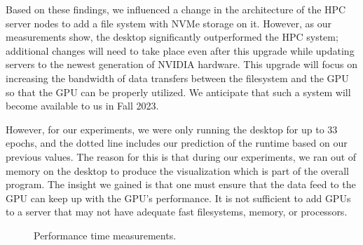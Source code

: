 Based on these findings, we influenced a change in the architecture of the HPC server nodes to add a file system with NVMe storage on it. However, as our measurements show, the desktop significantly outperformed the HPC system; additional changes will need to take place even after this upgrade while updating servers to the newest generation of NVIDIA hardware. This upgrade will focus on increasing the bandwidth of data transfers between the filesystem and the GPU so that the GPU can be properly utilized. We anticipate that such a system will become available to us in Fall 2023.

However, for our experiments, we were only running the desktop for up to 33 epochs, and the dotted line includes our prediction of the runtime based on our previous values. The reason for this is that during our experiments, we ran out of memory on the desktop to produce the visualization which is part of the overall program. The insight we gained is that one must ensure that the data feed to the GPU can keep up with the GPU's performance. It is not sufficient to add GPUs to a server that may not have adequate fast filesystems, memory, or processors.

\begin{figure}[p]

    
  \caption{Performance time measurements.}
  \label{fig:performance-projection}
\end{figure}


